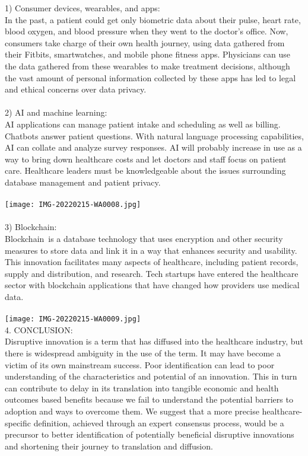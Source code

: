\documentclass{article}
\begin{document}
1) Consumer devices, wearables, and apps:\\        
In the past, a patient could get only biometric data about their pulse, heart rate, blood oxygen, and blood pressure when they went to the doctor’s office. Now, consumers take charge of their own health journey, using data gathered from their Fitbits, smartwatches, and mobile phone fitness apps. Physicians can use the data gathered from these wearables to make treatment decisions, although the vast amount of personal information collected by these apps has led to legal and ethical concerns over data privacy.\\
\\
2) AI and machine learning:\\ 
AI applications can manage patient intake and scheduling as well as billing. Chatbots answer patient questions. With natural language processing capabilities, AI can collate and analyze survey responses. AI will probably increase in use as a way to bring down healthcare costs and let doctors and staff focus on patient care. Healthcare leaders must be knowledgeable about the issues surrounding database management and patient privacy.\\
\\
\texttt{[image: IMG-20220215-WA0008.jpg]} 
\\
\\
3) Blockchain:\\ 
Blockchain is a database technology that uses encryption and other security measures to store data and link it in a way that enhances security and usability. This innovation facilitates many aspects of healthcare, including patient records, supply and distribution, and research. Tech startups have entered the healthcare sector with blockchain applications that have changed how providers use medical data.\\
\\
\texttt{[image: IMG-20220215-WA0009.jpg]}
\\

4. CONCLUSION:\\ 
Disruptive innovation is a term that has diffused into the 
healthcare industry, but there is widespread ambiguity in 
the use of the term. It may have become a victim of its 
own mainstream success. Poor identification can lead to 
poor understanding of the characteristics and potential of 
an innovation. This in turn can contribute to delay in its 
translation into tangible economic and health outcomes based benefits because we fail to understand the potential barriers to adoption and ways to overcome them. We suggest that a more precise healthcare-specific definition, achieved through an expert consensus process, would be a precursor to better identification of potentially beneficial disruptive innovations and shortening their journey 
to translation and diffusion.







%
%
\end{document}
